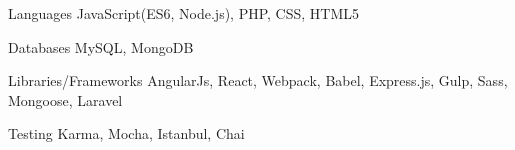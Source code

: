 

\begin{cvskills}

  \cvskill
    {Languages} %
    {JavaScript(ES6, Node.js), PHP, CSS, HTML5} %

  \cvskill
    {Databases} %
    {MySQL, MongoDB} %

  \cvskill
    {Libraries/Frameworks} %
    {AngularJs, React, Webpack, Babel, Express.js, Gulp, Sass, Mongoose, Laravel} %

  \cvskill
    {Testing} %
    {Karma, Mocha, Istanbul, Chai} %

\end{cvskills}
